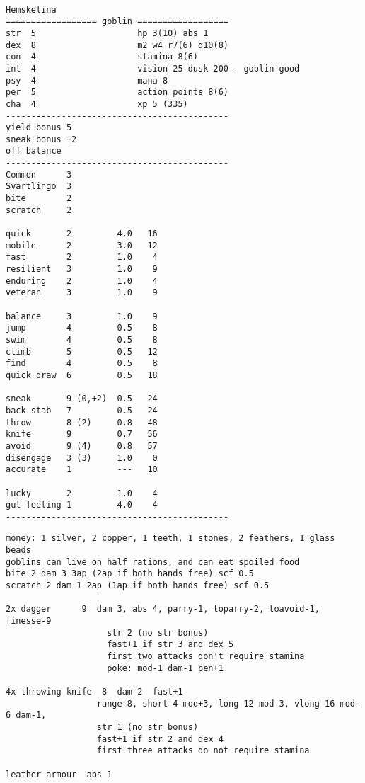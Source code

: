 \

\goodbreak \small \begin{samepage} \begin{verbatim}
Hemskelina
================== goblin ==================
str  5                    hp 3(10) abs 1
dex  8                    m2 w4 r7(6) d10(8)
con  4                    stamina 8(6)
int  4                    vision 25 dusk 200 - goblin good
psy  4                    mana 8
per  5                    action points 8(6)
cha  4                    xp 5 (335)
--------------------------------------------
yield bonus 5
sneak bonus +2
off balance
--------------------------------------------
Common      3
Svartlingo  3
bite        2
scratch     2

quick       2         4.0   16
mobile      2         3.0   12
fast        2         1.0    4
resilient   3         1.0    9
enduring    2         1.0    4
veteran     3         1.0    9

balance     3         1.0    9
jump        4         0.5    8
swim        4         0.5    8
climb       5         0.5   12
find        4         0.5    8
quick draw  6         0.5   18

sneak       9 (0,+2)  0.5   24
back stab   7         0.5   24
throw       8 (2)     0.8   48
knife       9         0.7   56
avoid       9 (4)     0.8   57
disengage   3 (3)     1.0    0
accurate    1         ---   10

lucky       2         1.0    4
gut feeling 1         4.0    4
--------------------------------------------
\end{verbatim} \goodbreak \begin{verbatim}
money: 1 silver, 2 copper, 1 teeth, 1 stones, 2 feathers, 1 glass beads
goblins can live on half rations, and can eat spoiled food
bite 2 dam 3 3ap (2ap if both hands free) scf 0.5
scratch 2 dam 1 2ap (1ap if both hands free) scf 0.5

2x dagger      9  dam 3, abs 4, parry-1, toparry-2, toavoid-1, finesse-9
                    str 2 (no str bonus)
                    fast+1 if str 3 and dex 5
                    first two attacks don't require stamina
                    poke: mod-1 dam-1 pen+1

4x throwing knife  8  dam 2  fast+1
                  range 8, short 4 mod+3, long 12 mod-3, vlong 16 mod-6 dam-1,
                  str 1 (no str bonus)
                  fast+1 if str 2 and dex 4
                  first three attacks do not require stamina

leather armour  abs 1
\end{verbatim} \end{samepage} \normalsize


























